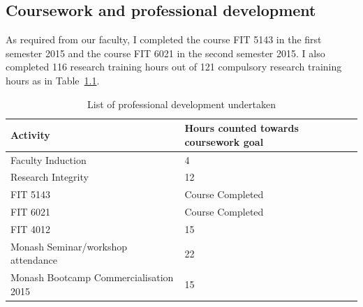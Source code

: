\documentclass[a4paper,11pt,phdthesis,singlespace,twoside]{cssethesis}
\begin{document}
\begin{itemize}
\chapter{Coursework and professional development}
\let\cleardoublepage\clearpage
As required from our faculty, I completed the course FIT 5143 in the first semester 2015 and the course FIT 6021 in the second semester 2015. I also completed 116 research training hours out of 121 compulsory research training hours as in Table~\ref{tab:research_training}.
\begin{table}[H]
\caption{List of professional development undertaken}
\begin{center}
\begin{tabular}{|l|l|} \hline
\textbf{Activity} & \textbf{Hours counted towards coursework goal}\\ \hline
Faculty Induction&4 \\ \hline
Research Integrity&12 \\ \hline
FIT 5143&Course	Completed \\ \hline
FIT 6021&Course Completed \\ \hline
FIT 4012&15 \\ \hline
Monash Seminar/workshop attendance&22 \\ \hline
Monash Bootcamp Commercialisation 2015&15 \\ \hline																									
\end{tabular}
\end{center}
\label{tab:research_training}
\end{table}

\appendix %

\end{itemize}
\end{document}
